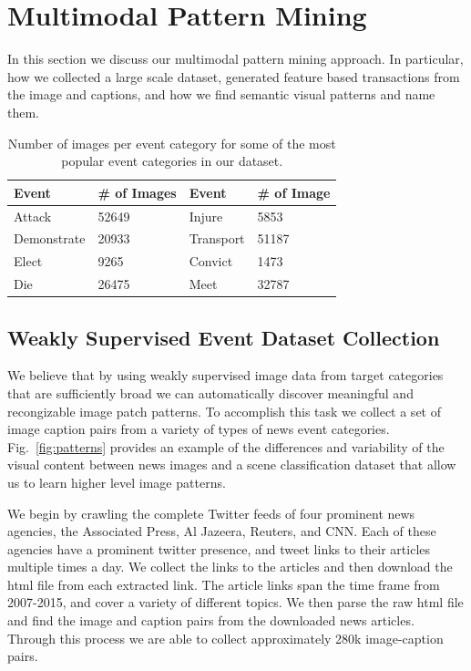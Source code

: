 \documentclass[10pt,twocolumn,letterpaper]{article}
\begin{document}
\section{Multimodal Pattern Mining}
In this section we discuss our multimodal pattern mining approach.
In particular, how we collected a large scale dataset, generated feature based transactions from the image and captions, and how we find semantic visual patterns and name them.

\begin{table}
\centering
\caption{Number of images per event category for some of the most popular event categories in our dataset.}
\begin{tabular}{ll|ll}
\hline
\hline
Event & \# of Images & Event & \# of Image \\ \hline
Attack & 52649 & Injure & 5853 \\
Demonstrate & 20933 & Transport & 51187 \\
Elect & 9265 & Convict & 1473 \\
Die & 26475 & Meet & 32787 \\ \hline
\end{tabular}
\label{tab:event_nums}
\end{table}

\subsection{Weakly Supervised Event Dataset Collection}
We believe that by using weakly supervised image data from target categories that are sufficiently broad we can automatically discover meaningful and recongizable image patch patterns.
To accomplish this task we collect a set of image caption pairs from a variety of types of news event categories.
Fig.~\ref{fig:patterns} provides an example of the differences and variability of the visual content between news images and a scene classification dataset that allow us to learn higher level image patterns.

We begin by crawling the complete Twitter feeds of four prominent news agencies, the Associated Press, Al Jazeera, Reuters, and CNN.
Each of these agencies have a prominent twitter presence, and tweet links to their articles multiple times a day.
We collect the links to the articles and then download the html file from each extracted link.
The article links span the time frame from 2007-2015, and cover a variety of different topics.
We then parse the raw html file and find the image and caption pairs from the downloaded news articles.
Through this process we are able to collect approximately 280k image-caption pairs.
\end{document}

